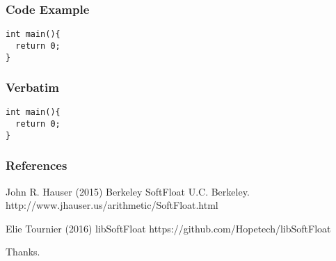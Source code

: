 \documentclass{beamer}
\begin{document}

\begin{frame}[fragile] %
\frametitle{Code Example}
\begin{example}
\begin{verbatim}
int main(){
  return 0;
}
\end{verbatim}
\end{example}

\frametitle{Verbatim}
\begin{example}
\begin{verbatim}
int main(){
  return 0;
}
\end{verbatim}
\end{example}

\end{frame}


\begin{frame}
\frametitle{References}
\footnotesize{
\begin{thebibliography}{99} %
 John R. Hauser (2015)
\newblock Berkeley SoftFloat
\newblock U.C. Berkeley.
\newblock http://www.jhauser.us/arithmetic/SoftFloat.html

 Elie Tournier (2016)
\newblock libSoftFloat
\newblock https://github.com/Hopetech/libSoftFloat

\end{thebibliography}
}
\end{frame}


\begin{frame}
\Huge{\centerline{Thanks.}}
\end{frame}

\end{document}
